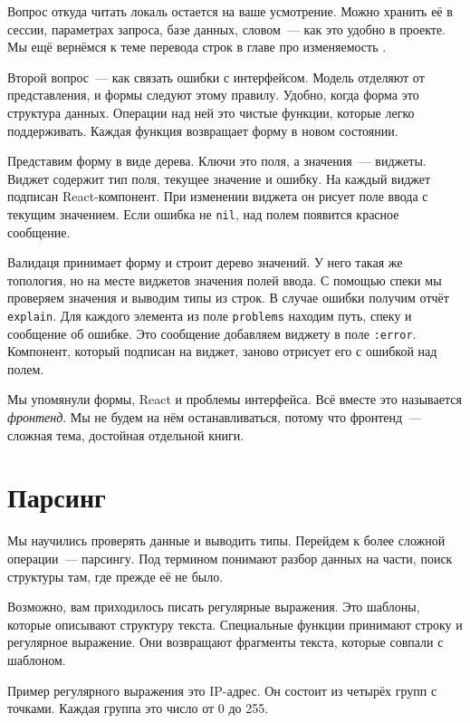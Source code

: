 Вопрос откуда читать локаль остается на ваше усмотрение. Можно хранить её в
сессии, параметрах запроса, базе данных, словом~--- как это удобно в проекте. Мы
ещё вернёмся к теме перевода строк в главе про изменяемость .

Второй вопрос~--- как связать ошибки с интерфейсом. Модель отделяют от
представления, и формы следуют этому правилу. Удобно, когда форма это структура
данных. Операции над ней это чистые функции, которые легко поддерживать. Каждая
функция возвращает форму в новом состоянии.

Представим форму в виде дерева. Ключи это поля, а значения~--- виджеты. Виджет
содержит тип поля, текущее значение и ошибку. На каждый виджет подписан
React-компонент. При изменении виджета он рисует поле ввода с текущим
значением. Если ошибка не \verb|nil|, над полем появится красное сообщение.

Валидаця принимает форму и строит дерево значений. У него такая же топология, но
на месте виджетов значения полей ввода. С помощью спеки мы проверяем значения и
выводим типы из строк. В случае ошибки получим отчёт \verb|explain|. Для
каждого элемента из поле \verb|problems| находим путь, спеку и сообщение об
ошибке. Это сообщение добавляем виджету в поле \verb|:error|. Компонент,
который подписан на виджет, заново отрисует его с ошибкой над полем.


Мы упомянули формы, React и проблемы интерфейса. Всё вместе это называется
\emph{фронтенд}. Мы не будем на нём останавливаться, потому что фронтенд~---
сложная тема, достойная отдельной книги.

\section{Парсинг}

Мы научились проверять данные и выводить типы. Перейдем к более сложной
операции~--- парсингу. Под термином понимают разбор данных на части, поиск
структуры там, где прежде её не было.

Возможно, вам приходилось писать регулярные выражения. Это шаблоны, которые
описывают структуру текста. Специальные функции принимают строку и регулярное
выражение. Они возвращают фрагменты текста, которые совпали с шаблоном.

Пример регулярного выражения это IP-адрес. Он состоит из четырёх групп с
точками. Каждая группа это число от 0 до 255.

